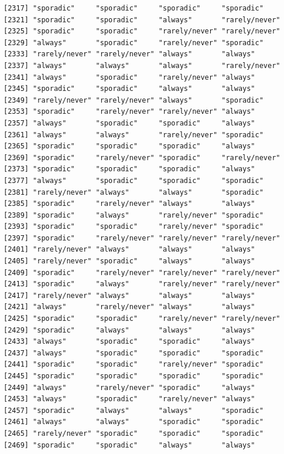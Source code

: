 \documentclass[
  letterpaper,
  DIV=11,
  numbers=noendperiod]{scrartcl}
\begin{document}
\begin{verbatim}
[2317] "sporadic"     "sporadic"     "sporadic"     "sporadic"    
[2321] "sporadic"     "sporadic"     "always"       "rarely/never"
[2325] "sporadic"     "sporadic"     "rarely/never" "rarely/never"
[2329] "always"       "sporadic"     "rarely/never" "sporadic"    
[2333] "rarely/never" "rarely/never" "always"       "always"      
[2337] "always"       "always"       "always"       "rarely/never"
[2341] "always"       "sporadic"     "rarely/never" "always"      
[2345] "sporadic"     "sporadic"     "always"       "always"      
[2349] "rarely/never" "rarely/never" "always"       "sporadic"    
[2353] "sporadic"     "rarely/never" "rarely/never" "always"      
[2357] "always"       "sporadic"     "sporadic"     "always"      
[2361] "always"       "always"       "rarely/never" "sporadic"    
[2365] "sporadic"     "sporadic"     "sporadic"     "always"      
[2369] "sporadic"     "rarely/never" "sporadic"     "rarely/never"
[2373] "sporadic"     "sporadic"     "sporadic"     "always"      
[2377] "always"       "sporadic"     "sporadic"     "sporadic"    
[2381] "rarely/never" "always"       "always"       "sporadic"    
[2385] "sporadic"     "rarely/never" "always"       "always"      
[2389] "sporadic"     "always"       "rarely/never" "sporadic"    
[2393] "sporadic"     "sporadic"     "rarely/never" "sporadic"    
[2397] "sporadic"     "rarely/never" "rarely/never" "rarely/never"
[2401] "rarely/never" "always"       "always"       "always"      
[2405] "rarely/never" "sporadic"     "always"       "always"      
[2409] "sporadic"     "rarely/never" "rarely/never" "rarely/never"
[2413] "sporadic"     "always"       "rarely/never" "rarely/never"
[2417] "rarely/never" "always"       "always"       "always"      
[2421] "always"       "rarely/never" "always"       "always"      
[2425] "sporadic"     "sporadic"     "rarely/never" "rarely/never"
[2429] "sporadic"     "always"       "always"       "always"      
[2433] "always"       "sporadic"     "sporadic"     "always"      
[2437] "always"       "sporadic"     "sporadic"     "sporadic"    
[2441] "sporadic"     "sporadic"     "rarely/never" "sporadic"    
[2445] "sporadic"     "sporadic"     "sporadic"     "sporadic"    
[2449] "always"       "rarely/never" "sporadic"     "always"      
[2453] "always"       "sporadic"     "rarely/never" "always"      
[2457] "sporadic"     "always"       "always"       "sporadic"    
[2461] "always"       "always"       "sporadic"     "sporadic"    
[2465] "rarely/never" "sporadic"     "sporadic"     "sporadic"    
[2469] "sporadic"     "sporadic"     "always"       "always"      

\end{verbatim}
\end{document}
